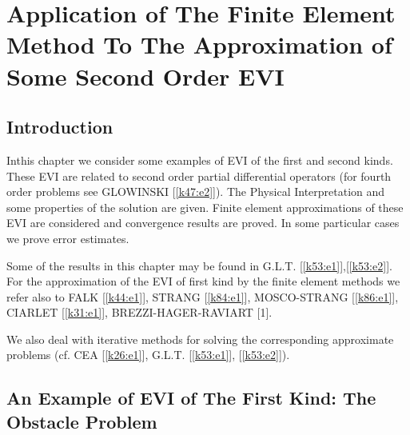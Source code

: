 
\chapter[Application of The Finite Element Method To...]{Application
  of The Finite Element Method To The Approximation 
  of Some Second Order EVI}\label{chap2}%

\section{Introduction}\label{c2:s1}%

In\pageoriginale this chapter we consider some examples of EVI of the
first and 
second kinds. These EVI are related to second order partial
differential operators (for fourth order problems see GLOWINSKI
[\ref{k47:e2}]). The Physical Interpretation and some properties of
the solution 
are given. Finite element approximations of these EVI are considered
and convergence results are proved. In some particular cases we prove
error estimates. 

Some of the results in this chapter may be found in
G.L.T. [\ref{k53:e1}],[\ref{k53:e2}]. For the approximation of the EVI of first kind by the
finite element methods we refer also to FALK [\ref{k44:e1}], STRANG
[\ref{k84:e1}],
MOSCO-STRANG [\ref{k86:e1}], CIARLET [\ref{k31:e1}],
BREZZI-HAGER-RAVIART [1].  

We also deal with iterative methods for solving the corresponding
approximate problems (cf. CEA [\ref{k26:e1}], G.L.T. [\ref{k53:e1}],
[\ref{k53:e2}]).  

\section[An Example of EVI of The First Kind:...]{An Example of EVI of 
The First Kind: The Obstacle Problem}\label{c2:s2}%

